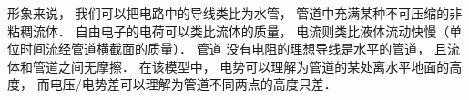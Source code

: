 

形象来说， 我们可以把电路中的导线类比为水管， 管道中充满某种不可压缩的非粘稠流体． 自由电子的电荷可以类比流体的质量， 电流则类比液体流动快慢（单位时间流经管道横截面的质量）． 管道  没有电阻的理想导线是水平的管道， 且流体和管道之间无摩擦． 在该模型中， 电势可以理解为管道的某处离水平地面的高度， 而电压/电势差可以理解为管道不同两点的高度只差．
